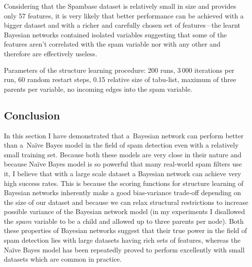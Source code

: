 \documentclass[english,cover]{fitthesis} %
\newcommand{\ignore}[1]{}                  %
\begin{document}
Considering that the Spambase dataset is relatively small in size and provides only 57 features, it is very likely that better performance can be achieved with a bigger dataset and with a richer and carefully chosen set of features\,--\,the learnt Bayesian networks contained isolated variables suggesting that some of the features aren't correlated with the spam variable nor with any other and therefore are effectively useless.

\medskip
Parameters of the structure learning procedure: 200 runs, 3\,000 iterations per run, 60 random restart steps, 0.15 relative size of tabu-list, maximum of three parents per variable, no incoming edges into the spam variable.


\subsection{Conclusion}
In this section I have demonstrated that a~Bayesian network can perform better than a~Naïve Bayes model in the field of spam detection even with a relatively small training set. Because both these models are very close in their nature and because Naïve Bayes model is so powerful that many real-world spam filters use it, I believe that with a large scale dataset a Bayesian network can achieve very high success rates. This is because the scoring functions for structure learning of Bayesian networks inherently make a good bias-variance trade-off depending on the size of our dataset and because we can relax structural restrictions to increase possible variance of the Bayesian network model (in my experiments I disallowed the $spam$ variable to be a child and allowed up to three parents per node). Both these properties of Bayesian networks suggest that their true power in the field of spam detection lies with large datasets having rich sets of features, whereas the Naïve Bayes model has been repeatedly proved to perform excellently with small datasets which are common in practice.


\ignore{
\bigskip
My notes:
\begin{itemize}
    \item Try naive, try naive with dependencies among non-label variables (disallow spam to be a child), totally unrestricted network
\end{itemize}



The usefulness of Naïve Bayesian model for spam classification has been studied in~\cite{heckerman98_spam}:
\begin{itemize}
    \item Indicators of spam: words (money, free, earn, 100\,\%, only), currency symbols, numbers, run-length of capital letters, send time, resolution of the source IP etc.~\cite{heckerman98_spam}
    \item can be trained specifically for a user and learn by his/her specific needs
    \item Heckerman argues that classification accuracy can be greatly improved using also non-textual features (time of sending, source IP address, etc.).
\end{itemize}
}
\end{document}
